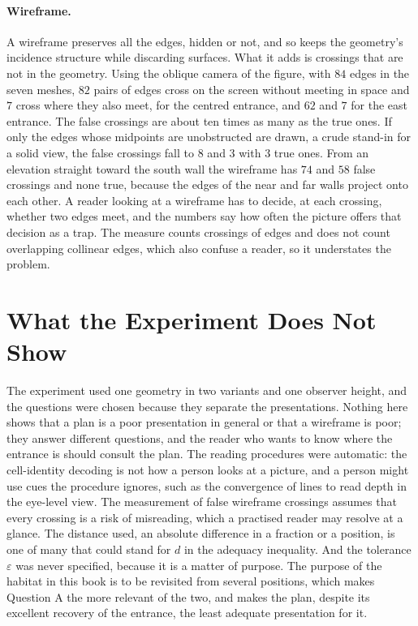 \paragraph{Wireframe.} A wireframe preserves all the edges, hidden or not, and so keeps the geometry's incidence structure while discarding surfaces. What it adds is crossings that are not in the geometry. Using the oblique camera of the figure, with $84$ edges in the seven meshes, $82$ pairs of edges cross on the screen without meeting in space and $7$ cross where they also meet, for the centred entrance, and $62$ and $7$ for the east entrance. The false crossings are about ten times as many as the true ones. If only the edges whose midpoints are unobstructed are drawn, a crude stand-in for a solid view, the false crossings fall to $8$ and $3$ with $3$ true ones. From an elevation straight toward the south wall the wireframe has $74$ and $58$ false crossings and none true, because the edges of the near and far walls project onto each other. A reader looking at a wireframe has to decide, at each crossing, whether two edges meet, and the numbers say how often the picture offers that decision as a trap. The measure counts crossings of edges and does not count overlapping collinear edges, which also confuse a reader, so it understates the problem.

\section{What the Experiment Does Not Show}

The experiment used one geometry in two variants and one observer height, and the questions were chosen because they separate the presentations. Nothing here shows that a plan is a poor presentation in general or that a wireframe is poor; they answer different questions, and the reader who wants to know where the entrance is should consult the plan. The reading procedures were automatic: the cell-identity decoding is not how a person looks at a picture, and a person might use cues the procedure ignores, such as the convergence of lines to read depth in the eye-level view. The measurement of false wireframe crossings assumes that every crossing is a risk of misreading, which a practised reader may resolve at a glance. The distance used, an absolute difference in a fraction or a position, is one of many that could stand for $d$ in the adequacy inequality. And the tolerance $\varepsilon$ was never specified, because it is a matter of purpose. The purpose of the habitat in this book is to be revisited from several positions, which makes Question A the more relevant of the two, and makes the plan, despite its excellent recovery of the entrance, the least adequate presentation for it.

